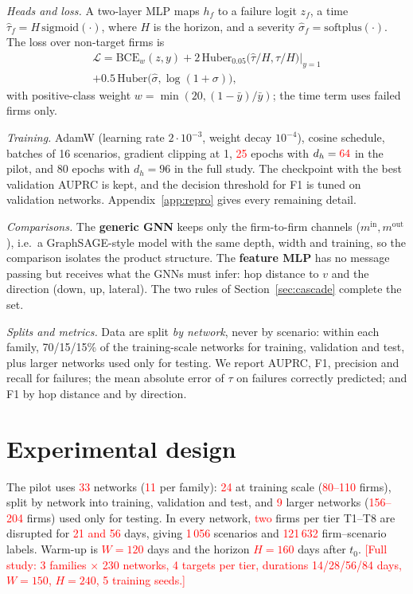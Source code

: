 \documentclass{ifacconf}
\newcommand{\pilot}[1]{\textcolor{red}{#1}}   %
\newcommand{\todo}[1]{\textcolor{red}{[#1]}}
\begin{document}
\emph{Heads and loss.} A two-layer MLP maps $h_f$ to a failure logit $z_f$, a time $\hat\tau_f=H\,\mathrm{sigmoid}(\cdot)$, where $H$ is the horizon, and a severity $\hat\sigma_f=\mathrm{softplus}(\cdot)$. The loss over non-target firms is
\begin{multline}
\mathcal{L}=\mathrm{BCE}_{w}(z,y)+2\,\mathrm{Huber}_{0.05}\big(\hat\tau/H,\tau/H\big)\big|_{y=1}\\
+0.5\,\mathrm{Huber}\big(\hat\sigma,\log(1+\sigma)\big),
\end{multline}
with positive-class weight $w=\min(20,(1-\bar y)/\bar y)$; the time term uses failed firms only.

\emph{Training.} AdamW (learning rate $2\cdot10^{-3}$, weight decay $10^{-4}$), cosine schedule, batches of 16 scenarios, gradient clipping at 1, \pilot{25} epochs with $d_h=\pilot{64}$ in the pilot, and 80 epochs with $d_h=96$ in the full study. The checkpoint with the best validation AUPRC is kept, and the decision threshold for F1 is tuned on validation networks. Appendix~\ref{app:repro} gives every remaining detail.

\emph{Comparisons.} The \textbf{generic GNN} keeps only the firm-to-firm channels ($m^{\mathrm{in}},m^{\mathrm{out}}$), i.e.\ a GraphSAGE-style model \citep{Hamilton2017} with the same depth, width and training, so the comparison isolates the product structure. The \textbf{feature MLP} has no message passing but receives what the GNNs must infer: hop distance to $v$ and the direction (down, up, lateral). The two rules of Section~\ref{sec:cascade} complete the set.

\emph{Splits and metrics.} Data are split \emph{by network}, never by scenario: within each family, 70/15/15\% of the training-scale networks for training, validation and test, plus larger networks used only for testing. We report AUPRC, F1, precision and recall for failures; the mean absolute error of $\tau$ on failures correctly predicted; and F1 by hop distance and by direction.

\section{Experimental design}

The pilot uses \pilot{33} networks (\pilot{11} per family): \pilot{24} at training scale (\pilot{80--110} firms), split by network into training, validation and test, and \pilot{9} larger networks (\pilot{156--204} firms) used only for testing. In every network, \pilot{two} firms per tier T1--T8 are disrupted for \pilot{21 and 56} days, giving \pilot{1\,056} scenarios and \pilot{121\,632} firm--scenario labels. Warm-up is \pilot{$W=120$} days and the horizon \pilot{$H=160$} days after $t_0$. \todo{Full study: 3 families $\times$ 230 networks, 4 targets per tier, durations 14/28/56/84 days, $W=150$, $H=240$, 5 training seeds.}
\end{document}
